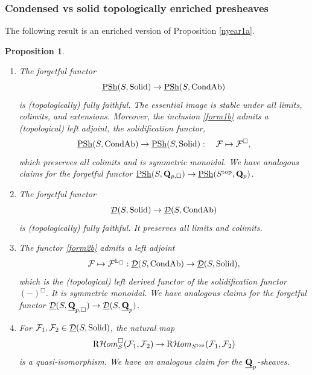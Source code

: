 \documentclass[10pt]{amsart}
\let\cal\mathcal
\newtheorem{proposition}[equation]{Proposition}
\theoremstyle{definition}
\theoremstyle{remark}
\newcommand{\Hhom}{{\cal Hom}}
\newcommand{\LL}{\operatorname{L} }
\newcommand{\sff}{{\mathcal{F}}}
\newcommand{\sd}{{\mathcal{D}}}
\numberwithin{equation}{section}
\def\R{{\mathrm R}}
\def\Q{{\bf Q}} \def\Z{{\bf Z}}
\numberwithin{equation}{section}
\begin{document}
\subsubsection{Condensed vs solid topologically enriched presheaves} 
 The following result is an enriched  version of Proposition \ref{nyear1a}. 
  \begin{proposition}\label{nyear1b}
  \begin{enumerate}
 \item  The forgetful functor
 \begin{equation}\label{form1b}
 \underline{{\rm PSh}}(S, {\rm Solid})\to  \underline{{\rm PSh}}(S,{\rm CondAb})
 \end{equation}
 is  (topologically) fully faithful. The essential image is
  stable under all limits, colimits, and extensions.  Moreover, the
inclusion \eqref{form1b} admits a (topological)  left adjoint, the solidification functor, 
\begin{equation}
 \label{form11b}
\underline{{\rm PSh}}(S,{\rm CondAb})\to  \underline{{\rm PSh}}(S,{\rm Solid}): \quad \sff \mapsto \sff^{\Box}, 
 \end{equation}
which   preserves all colimits and is  symmetric monoidal. We have analogous claims for the forgetful functor  
${\underline{\rm PSh}}(S,\Q_{p,\Box}) \to \underline{{\rm PSh}}(S^{\rm top},\Q_p)$.
\item 
  The  forgetful functor
  \begin{equation}\label{form2b}
  \underline{\sd}(S,{\rm Solid})\to \underline{\sd}(S,{\rm CondAb})
  \end{equation}
   is  (topologically) fully faithful.   It preserves  all limits and colimits. 
\item The functor \eqref{form2b}  admits a  left adjoint
$$\sff  \mapsto  \sff^{\LL_{\Box}}: \underline{\sd}(S,{\rm CondAb}) \to \underline{\sd}(S,{\rm Solid}),
$$
which is the (topological)  left derived functor of the solidification functor $(-)^{\Box}$. It is symmetric monoidal. We have analogous claims for the forgetful functor
 $\underline{\sd}(S,\underline{\Q}_{p,\Box})\to \underline{\sd}(S,\underline{\Q}_{p})$.
\item  For  $\sff_1, \sff_2 \in \underline{\sd}(S,{\rm Solid})$, the natural map
$$\R{\Hhom}^{\Box}_{S}(\sff_1,\sff_2) \to  \R{\Hhom}_{S^{\rm top}}(\sff_1,\sff_2)$$
is a quasi-isomorphism. We have an analogous claim for the $\underline{\Q}_p$-sheaves.
\end{enumerate}
  \end{proposition}
\end{document}
